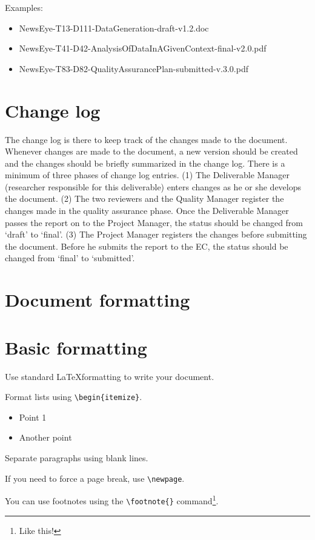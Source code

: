 \documentclass{newseye_del}
\begin{document}
Examples:
\begin{itemize}
    \item NewsEye-T13-D111-DataGeneration-draft-v1.2.doc
    \item NewsEye-T41-D42-AnalysisOfDataInAGivenContext-final-v2.0.pdf
    \item NewsEye-T83-D82-QualityAssurancePlan-submitted-v.3.0.pdf
\end{itemize}

\section{Change log}

The change log is there to keep track of the changes made to the document.
Whenever changes are made to the document, a new version should be created and
the changes should be briefly summarized in the change log. There is a minimum
of three phases of change log entries. (1) The Deliverable Manager (researcher
responsible for this deliverable) enters changes as he or she develops the
document. (2) The two reviewers and the Quality Manager register the changes
made in the quality assurance phase. Once the Deliverable Manager passes the
report on to the Project Manager, the status should be changed from `draft'
to `final'. (3) The Project Manager registers the changes before submitting
the document. Before he submits the report to the EC, the status should be
changed from `final' to `submitted'.

\section{Document formatting}
\section{Basic formatting}
Use standard \LaTeX formatting to write your document.

Format lists using \verb.\begin{itemize}..
\begin{itemize}
    \item Point 1
		\item Another point
\end{itemize}

Separate paragraphs using blank lines.

If you need to force a page break, use \verb.\newpage..

You can use footnotes using the \verb.\footnote{}. command\footnote{%
	Like this!
}.
\end{document}

